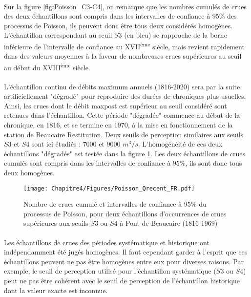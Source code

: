 	\paragraph{} Sur la figure \ref{fig:Poisson_C3-C4}, on remarque que les nombres cumulés de crues des deux échantillons sont compris dans les intervalles de confiance à 95\% des processus de Poisson, ils peuvent donc être tous deux considérés homogènes. L'échantillon correspondant au seuil $S3$ (en bleu) se rapproche de la borne inférieure de l'intervalle de confiance au XVII\textsuperscript{ème} siècle, mais revient rapidement dans des valeurs moyennes à la faveur de nombreuses crues supérieures au seuil au début du XVIII\textsuperscript{ème} siècle. 
	
	\paragraph{} L'échantillon continu de débits maximum annuels (1816-2020) sera par la suite artificiellement "dégradé" pour reproduire des durées de chroniques plus usuelles. Ainsi, les crues dont le débit maxpost est supérieur au seuil considéré sont retenues dans l'échantillon. Cette période "dégradée" commence au début de la chronique, en 1816, et se termine en 1970, à la mise en fonctionnement de la station de Beaucaire Restitution. Deux seuils de perception similaires aux seuils $S3$ et $S4$ sont ici étudiés : 7000 et 9000 $m^3/s$. L'homogénéité de ces deux échantillons "dégradés" est testée dans la figure \ref{fig:Poisson_Recent}. Les deux échantillons de crues cumulés sont compris dans les intervalles de confiance à 95\%, ils sont donc tous deux homogènes. 
	
	\begin{figure}[h]
		\centering
		\texttt{[image: Chapitre4/Figures/Poisson\_Qrecent\_FR.pdf]}	
		\caption{Nombre de crues cumulé et intervalles de confiance à 95\% du processus de 						Poisson, pour deux échantillons d'occurrences de crues supérieures aux seuils $S3$ ou $S4$ à Pont de Beaucaire 							(1816-1969) }
		\label{fig:Poisson_Recent}
	\end{figure}
	
	
	\paragraph{} Les échantillons de crues des périodes systématique et historique ont indépendamment été jugés homogènes. Il faut cependant garder à l'esprit que ces échantillons peuvent ne pas être homogènes entre eux pour diverses raisons. Par exemple, le seuil de perception utilisé pour l'échantillon systématique ($S3$ ou $S4$) peut ne pas être cohérent avec le seuil de perception de l'échantillon historique dont la valeur exacte est inconnue. 		
		

